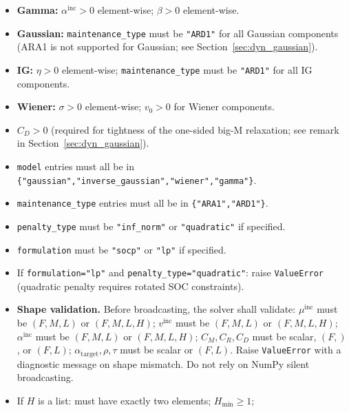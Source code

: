 \documentclass[11pt,a4paper]{article}
\begin{document}
\begin{itemize}[leftmargin=1.5em]
        \emph{Remark.} The $\mu \geq 3\sqrt{v}$ condition ensures that the Gaussian
        degradation distribution has negligible probability of negative values
        (less than $0.13\%$ when $\mu \geq 3\sigma$), maintaining physical validity
        of the non-negative degradation assumption.
  \item \textbf{Gamma:} $\alpha^{\mathrm{inc}} > 0$ element-wise; $\beta > 0$ element-wise.
  \item \textbf{Gaussian:} \texttt{maintenance\_type} must be \texttt{"ARD1"} for
        all Gaussian components (ARA1 is not supported for Gaussian; see
        Section~\ref{sec:dyn_gaussian}).
  \item \textbf{IG:} $\eta > 0$ element-wise; \texttt{maintenance\_type} must be
        \texttt{"ARD1"} for all IG components.
  \item \textbf{Wiener:} $\sigma > 0$ element-wise; $v_0 > 0$ for Wiener components.
  \item $C_D > 0$ (required for tightness of the one-sided big-M relaxation;
        see remark in Section~\ref{sec:dyn_gaussian}).
  \item \texttt{model} entries must all be in
        \texttt{\{"gaussian","inverse\_gaussian","wiener","gamma"\}}.
  \item \texttt{maintenance\_type} entries must all be in \texttt{\{"ARA1","ARD1"\}}.
  \item \texttt{penalty\_type} must be \texttt{"inf\_norm"} or \texttt{"quadratic"}
        if specified.
  \item \texttt{formulation} must be \texttt{"socp"} or \texttt{"lp"} if specified.
  \item If \texttt{formulation="lp"} and \texttt{penalty\_type="quadratic"}:
        raise \texttt{ValueError} (quadratic penalty requires rotated SOC constraints).
  \item \textbf{Shape validation.} Before broadcasting, the solver shall validate:
        $\mu^{\mathrm{inc}}$ must be $(F, M, L)$ or $(F, M, L, H)$;
        $v^{\mathrm{inc}}$ must be $(F, M, L)$ or $(F, M, L, H)$;
        $\alpha^{\mathrm{inc}}$ must be $(F, M, L)$ or $(F, M, L, H)$;
        $C_M, C_R, C_D$ must be scalar, $(F,)$, or $(F, L)$;
        $\alpha_{\mathrm{target}}, \rho, \tau$ must be scalar or $(F, L)$.
        Raise \texttt{ValueError} with a diagnostic message on shape mismatch.
        Do not rely on NumPy silent broadcasting.
  \item If $H$ is a list: must have exactly two elements; $H_{\min} \geq 1$;

\end{itemize}
\end{document}
